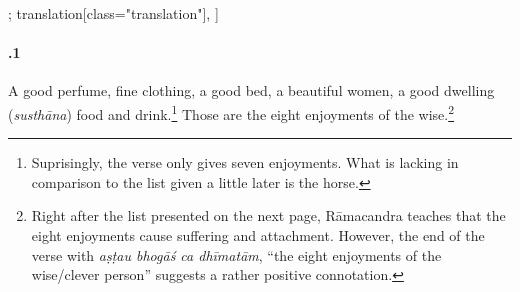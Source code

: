 \begin{alignment}[
  texts=edition[class="edition"];
  translation[class="translation"],
  ]
\begin{translation}
\begin{tlate}[22_1]
\paragraph{.1} A good perfume, fine clothing, a good bed, a beautiful women, a good dwelling (\textit{susthāna}) food and drink.\footnote{Suprisingly, the verse only gives seven enjoyments. What is lacking in comparison to the list given a little later is the horse.} Those are the eight enjoyments of the wise.\footnote{Right after the list presented on the next page, Rāmacandra teaches that the eight enjoyments cause suffering and attachment. However, the end of the verse with \textit{aṣṭau bhogāś ca dhīmatām}, ``the eight enjoyments of the wise/clever person'' suggests a rather positive connotation.}
    \end{tlate}
  \end{translation}
\end{alignment}
\pagebreak %
